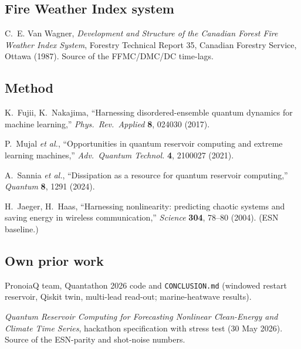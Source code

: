\documentclass[11pt,a4paper]{article}
\newcommand{\code}[1]{\texttt{\small #1}}
\begin{document}
\subsection*{Fire Weather Index system}
\begin{enumerate}[label={[F\arabic*]},leftmargin=3em]
\item C.~E. Van Wagner, \emph{Development and Structure of the Canadian Forest Fire Weather Index System},
  Forestry Technical Report 35, Canadian Forestry Service, Ottawa (1987). Source of the FFMC/DMC/DC time-lags.
\end{enumerate}

\subsection*{Method}
\begin{enumerate}[label={[M\arabic*]},leftmargin=3em]
\item K.~Fujii, K.~Nakajima, ``Harnessing disordered-ensemble quantum dynamics for machine learning,''
  \emph{Phys.\ Rev.\ Applied} \textbf{8}, 024030 (2017).
\item P.~Mujal \emph{et al.}, ``Opportunities in quantum reservoir computing and extreme learning machines,''
  \emph{Adv.\ Quantum Technol.} \textbf{4}, 2100027 (2021).
\item A.~Sannia \emph{et al.}, ``Dissipation as a resource for quantum reservoir computing,''
  \emph{Quantum} \textbf{8}, 1291 (2024).
\item H.~Jaeger, H.~Haas, ``Harnessing nonlinearity: predicting chaotic systems and saving energy in wireless
  communication,'' \emph{Science} \textbf{304}, 78--80 (2004). (ESN baseline.)
\end{enumerate}

\subsection*{Own prior work}
\begin{enumerate}[label={[P\arabic*]},leftmargin=3em]
\item PronoiaQ team, Quantathon 2026 code and \code{CONCLUSION.md} (windowed restart reservoir, Qiskit twin,
  multi-lead read-out; marine-heatwave results).
\item \emph{Quantum Reservoir Computing for Forecasting Nonlinear Clean-Energy and Climate Time Series},
  hackathon specification with stress test (30 May 2026). Source of the ESN-parity and shot-noise numbers.
\end{enumerate}
\end{document}
